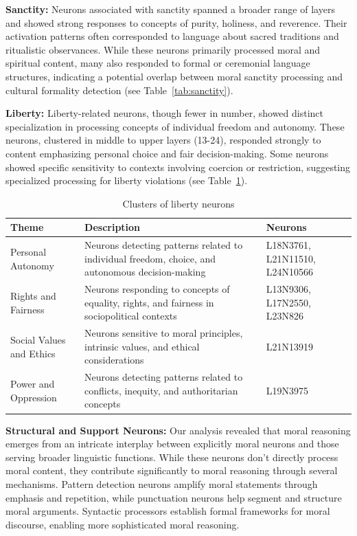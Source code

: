 \documentclass[runninghheads]{llncs}
\begin{document}
\textbf{Sanctity:} Neurons associated with sanctity spanned a broader range of layers and showed strong responses to concepts of purity, holiness, and reverence. Their activation patterns often corresponded to language about sacred traditions and ritualistic observances. While these neurons primarily processed moral and spiritual content, many also responded to formal or ceremonial language structures, indicating a potential overlap between moral sanctity processing and cultural formality detection (see Table~\ref{tab:sanctity}).



\textbf{Liberty:} Liberty-related neurons, though fewer in number, showed distinct specialization in processing concepts of individual freedom and autonomy. These neurons, clustered in middle to upper layers (13-24), responded strongly to content emphasizing personal choice and fair decision-making. Some neurons showed specific sensitivity to contexts involving coercion or restriction, suggesting specialized processing for liberty violations (see Table~\ref{tab:liberty}).



\begin{table}[!tb]
    \centering
    \begin{tabular}{|p{3cm}|p{5.5cm}|p{3.5cm}|}
    \hline
        \textbf{Theme} & \textbf{Description} & \textbf{Neurons} \\ \hline
        Personal Autonomy & Neurons detecting patterns related to individual freedom, choice, and autonomous decision-making & L18N3761, L21N11510, L24N10566 \\ \hline
        Rights and Fairness & Neurons responding to concepts of equality, rights, and fairness in sociopolitical contexts & L13N9306, L17N2550, L23N826 \\ \hline
        Social Values and Ethics & Neurons sensitive to moral principles, intrinsic values, and ethical considerations & L21N13919 \\ \hline
        Power and Oppression & Neurons detecting patterns related to conflicts, inequity, and authoritarian concepts & L19N3975 \\ \hline
    \end{tabular}
    \caption{Clusters of liberty neurons}
    \label{tab:liberty}
\end{table}




\textbf{Structural and Support Neurons:} Our analysis revealed that moral reasoning emerges from an intricate interplay between explicitly moral neurons and those serving broader linguistic functions. While these neurons don't directly process moral content, they contribute significantly to moral reasoning through several mechanisms. Pattern detection neurons amplify moral statements through emphasis and repetition, while punctuation neurons help segment and structure moral arguments. Syntactic processors establish formal frameworks for moral discourse, enabling more sophisticated moral reasoning.
\end{document}
